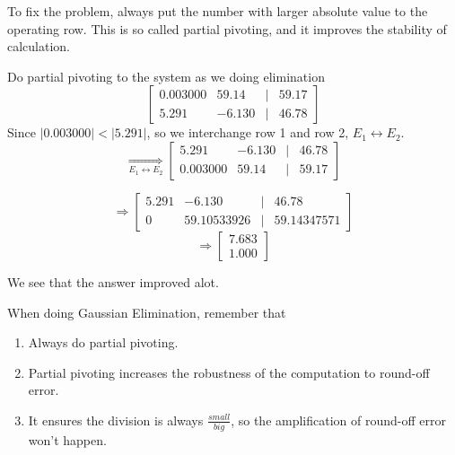 	To fix the problem, always put the number with larger absolute value to the operating row. This is so called partial pivoting, and it improves the stability of calculation.
	
	\begin{ex}
		Do partial pivoting to the system as we doing elimination
		\[\begin{bmatrix}
		0.003000 & 59.14 &| &59.17\\
		5.291    & -6.130 &| &46.78
		\end{bmatrix}
		\]
		Since $|0.003000| < |5.291|$, so we interchange row 1 and row 2, $E_1 \leftrightarrow E_2$.
		\[
		\underset{E_1 \leftrightarrow E_2}{\Rightarrow}
		\begin{bmatrix}
		5.291    & -6.130 &| &46.78\\
		0.003000 & 59.14 &| &59.17
		\end{bmatrix}\]
		
		\[\Rightarrow
		\begin{bmatrix}
		5.291    & -6.130 &| &46.78\\
		0    & 59.10533926 &| & 59.14347571
		\end{bmatrix}\]
		\[
		\Rightarrow
		\begin{bmatrix}
		7.683\\
		1.000
		\end{bmatrix}
		\]
	\end{ex}
	
	
	We see that the answer improved alot.
	
	
	\begin{summary}
		When doing Gaussian Elimination, remember that
		\begin{enumerate}
			\item Always do partial pivoting.
			\item Partial pivoting increases the robustness of the computation to round-off error.
			\item It ensures the division is always $\frac{small}{big}$, so the amplification of round-off error won't happen.
		\end{enumerate}
	\end{summary}
	
	
